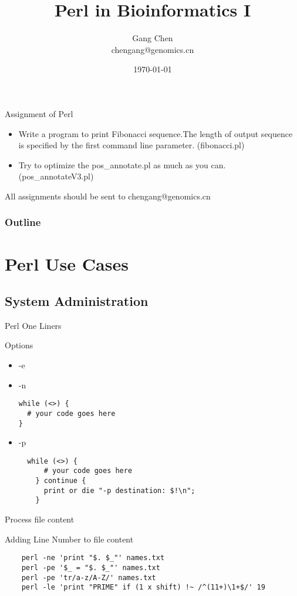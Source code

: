 \documentclass[UTF8]{beamer}
\title{Perl in Bioinformatics I}
\author{Gang Chen\\ chengang@genomics.cn}
\date{\today}
\begin{document}
\begin{frame}
\begin{block}{Assignment of Perl}
\begin{itemize}
\item Write a program to print Fibonacci sequence.The length of output sequence
is specified by the first command line parameter. (fibonacci.pl)
\item Try to optimize the pos_annotate.pl as much as you can. (pos_annotateV3.pl)
\end{itemize}
All assignments should be sent to chengang@genomics.cn
\end{block}
\end{frame}

\begin{frame}
\titlepage
\end{frame}
\begin{frame}[t]\frametitle{Outline}
\tableofcontents[hideallsubsections]
\end{frame}


\section{Perl Use Cases}

\subsection{System Administration}

\begin{frame}[fragile]{Perl One Liners}
\begin{block}{Options}
  \begin{itemize}
    \item -e
    \item -n
    \begin{verbatim}
while (<>) {
  # your code goes here
}
    \end{verbatim}
    \item -p
\begin{verbatim}
  while (<>) {
      # your code goes here
    } continue {
      print or die "-p destination: $!\n";
    }
\end{verbatim}
  \end{itemize}
\end{block}
\end{frame}

\begin{frame}[fragile]{Process file content}
\begin{block}{Adding Line Number to file content}
  \begin{verbatim}
    perl -ne 'print "$. $_"' names.txt
    perl -pe '$_ = "$. $_"' names.txt
    perl -pe 'tr/a-z/A-Z/' names.txt
    perl -le 'print "PRIME" if (1 x shift) !~ /^(11+)\1+$/' 19
  \end{verbatim}
\end{block}
\end{frame}
\end{document}
